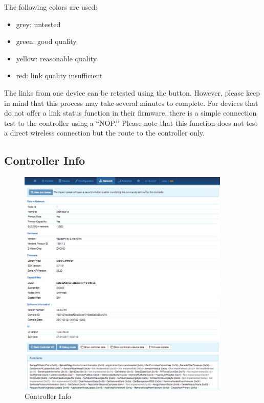 {The following colors are used:

\begin{itemize}
\item grey: untested
\item green: good quality
\item yellow: reasonable quality
\item red: link quality insufficient
\end{itemize}

The links from one device can be retested using the  button. However, please 
keep in mind that this process may take several minutes to complete.
For devices that do not offer a link status function in their firmware, there is a simple 
connection test to the \zway controller using a ``NOP.’’ Please note that this function 
does not test a direct wireless connection but the route to the controller only.

\subsection{Controller Info}

\begin{figure}
\begin{center}
\includegraphics[width=0.9\textwidth]{pngs/cap7/eui27.png}
\caption{Controller Info}
\label{eui27}
\end{center}
\end{figure}

}
